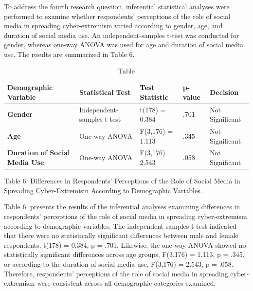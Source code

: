 \documentclass[10pt]{NSP1}
\begin{document}
\par\vspace{5.0pt}\vspace{5.0pt}

To address the fourth research question, inferential statistical analyses were performed to examine whether respondents' perceptions of the role of social media in spreading cyber-extremism varied according to gender, age, and duration of social media use. An independent-samples t-test was conducted for gender, whereas one-way ANOVA was used for age and duration of social media use. The results are summarized in Table 6.

\begin{table}[tbp]
\centering
{\small
\begin{tabular}{|>{\centering\arraybackslash}p{}|>{\centering\arraybackslash}p{}|>{\centering\arraybackslash}p{}|p{}|>{\centering\arraybackslash}p{}|}
\hline
\cellcolor[HTML]{DDD9C3}\textbf{Demographic Variable} & \cellcolor[HTML]{DDD9C3}\textbf{Statistical Test} & \cellcolor[HTML]{DDD9C3}\textbf{Test Statistic} & \cellcolor[HTML]{DDD9C3}\textbf{p-value} & \cellcolor[HTML]{DDD9C3}\textbf{Decision} \\
\hline
\cellcolor[HTML]{DDD9C3}\textbf{Gender} & Independent-samples t-test & t(178) = 0.384 & .701 & Not Significant \\
\hline
\cellcolor[HTML]{DDD9C3}\textbf{Age} & One-way ANOVA & F(3,176) = 1.113 & .345 & Not Significant \\
\hline
\cellcolor[HTML]{DDD9C3}\textbf{Duration of Social Media Use} & One-way ANOVA & F(3,176) = 2.543 & .058 & Not Significant \\
\hline
\end{tabular}}
\caption{Table}

\end{table}

Table 6: Differences in Respondents' Perceptions of the Role of Social Media in Spreading Cyber-Extremism According to Demographic Variables.

Table 6: presents the results of the inferential analyses examining differences in respondents' perceptions of the role of social media in spreading cyber-extremism according to demographic variables. The independent-samples t-test indicated that there were no statistically significant differences between male and female respondents, t(178) = 0.384, p = .701. Likewise, the one-way ANOVA showed no statistically significant differences across age groups, F(3,176) = 1.113, p = .345, or according to the duration of social media use, F(3,176) = 2.543, p = .058. Therefore, respondents' perceptions of the role of social media in spreading cyber-extremism were consistent across all demographic categories examined.
\end{document}
